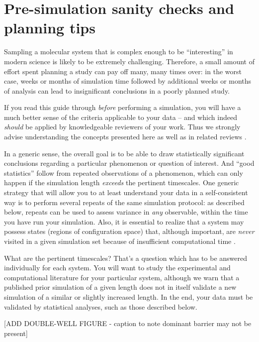 \section{Pre-simulation sanity checks and planning tips}
\label{sec:sanity}

Sampling a molecular system that is complex enough to be ``interesting'' in modern science is likely to be extremely challenging.
Therefore, a small amount of effort spent planning a study can pay off many, many times over: in the worst case, weeks or months of simulation time followed by additional weeks or months of analysis can lead to insignificant conclusions in a poorly planned study.

If you read this guide through \emph{before} performing a simulation, you will have a much better sense of the criteria applicable to your data -- and which indeed \emph{should} be applied by knowledgeable reviewers of your work.
Thus we strongly advise understanding the concepts presented here as well as in related reviews \cite{Grossfield2009,JCGM:GUM2008}.

In a generic sense, the overall goal is to be able to draw statistically significant conclusions regarding a particular phenomenon or question of interest.
And ``good statistics'' follow from repeated observations of a phenomenon, which can only happen if the simulation length \emph{exceeds} the pertinent timescales.
One generic strategy that will allow you to at least understand your data in a self-consistent way is to perform several repeats of the same simulation protocol: as described below, repeats can be used to assess variance in \emph{any} observable, within the time you have run your simulation.
Also, it is essential to realize that a system may possess states (regions of configuration space) that, although important, are \emph{never} visited in a given simulation set because of insufficient computational time \cite{Grossfield2009}.

What are the pertinent timescales?
That's a question which has to be answered individually for each system.
You will want to study the experimental and computational literature for your particular system, although we warn that a published prior simulation of a given length does not in itself validate a new simulation of a similar or slightly increased length.
In the end, your data must be validated by statistical analyses, such as those described below.

[ADD DOUBLE-WELL FIGURE - caption to note dominant barrier may not be present]

